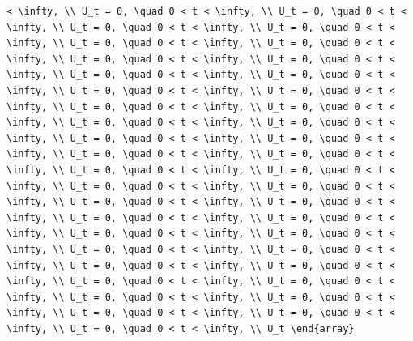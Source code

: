 \documentclass[
  ukrainian,
]{article}
\begin{document}
\begin{verbatim}
< \infty, \\ U_t = 0, \quad 0 < t < \infty, \\ U_t = 0, \quad 0 < t < \infty, \\ U_t = 0, \quad 0 < t < \infty, \\ U_t = 0, \quad 0 < t < \infty, \\ U_t = 0, \quad 0 < t < \infty, \\ U_t = 0, \quad 0 < t < \infty, \\ U_t = 0, \quad 0 < t < \infty, \\ U_t = 0, \quad 0 < t < \infty, \\ U_t = 0, \quad 0 < t < \infty, \\ U_t = 0, \quad 0 < t < \infty, \\ U_t = 0, \quad 0 < t < \infty, \\ U_t = 0, \quad 0 < t < \infty, \\ U_t = 0, \quad 0 < t < \infty, \\ U_t = 0, \quad 0 < t < \infty, \\ U_t = 0, \quad 0 < t < \infty, \\ U_t = 0, \quad 0 < t < \infty, \\ U_t = 0, \quad 0 < t < \infty, \\ U_t = 0, \quad 0 < t < \infty, \\ U_t = 0, \quad 0 < t < \infty, \\ U_t = 0, \quad 0 < t < \infty, \\ U_t = 0, \quad 0 < t < \infty, \\ U_t = 0, \quad 0 < t < \infty, \\ U_t = 0, \quad 0 < t < \infty, \\ U_t = 0, \quad 0 < t < \infty, \\ U_t = 0, \quad 0 < t < \infty, \\ U_t = 0, \quad 0 < t < \infty, \\ U_t = 0, \quad 0 < t < \infty, \\ U_t = 0, \quad 0 < t < \infty, \\ U_t = 0, \quad 0 < t < \infty, \\ U_t = 0, \quad 0 < t < \infty, \\ U_t = 0, \quad 0 < t < \infty, \\ U_t = 0, \quad 0 < t < \infty, \\ U_t = 0, \quad 0 < t < \infty, \\ U_t = 0, \quad 0 < t < \infty, \\ U_t = 0, \quad 0 < t < \infty, \\ U_t = 0, \quad 0 < t < \infty, \\ U_t = 0, \quad 0 < t < \infty, \\ U_t = 0, \quad 0 < t < \infty, \\ U_t = 0, \quad 0 < t < \infty, \\ U_t = 0, \quad 0 < t < \infty, \\ U_t = 0, \quad 0 < t < \infty, \\ U_t \end{array}
\end{verbatim}
\end{document}
